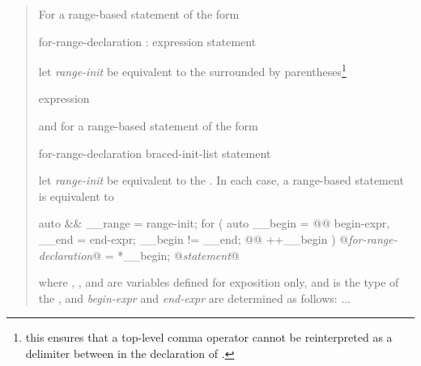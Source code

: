 \begin{quote}
\setcounter{Paras}{0}
\pnum
For a range-based  statement of the form

\begin{ncbnf}
    \terminal{(} for-range-declaration : expression \terminal{)} statement
\end{ncbnf}

let \textit{range-init} be equivalent to the  surrounded
by parentheses\footnote{this ensures that a top-level comma operator cannot be
  reinterpreted as a delimiter between  in the
  declaration of .}

\begin{ncbnf}
  \terminal{(} expression \terminal{)}
\end{ncbnf}

and for a range-based  statement of the form

\begin{ncbnf}
    \terminal{(} for-range-declaration \terminal{:} braced-init-list \terminal{)} statement
\end{ncbnf}

let \textit{range-init} be equivalent to the . In each case, a
range-based  statement
is equivalent to

\begin{codeblock}
  {
    auto && __range = range-init;
    for ( auto __begin =  @@ begin-expr,
    __end = end-expr;
    __begin != __end;
     @@ ++__begin ) {
      @\textit{for-range-declaration}@ = *__begin;
      @\textit{statement}@
    }
  }
\end{codeblock}

where 
\linebreak
{}, , and  are variables defined for
exposition only, and  is the type of the
, and \textit{begin-expr} and \textit{end-expr} are
determined as follows: ...


\end{quote}


